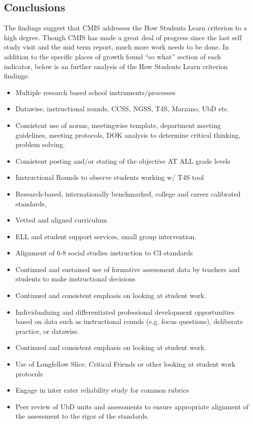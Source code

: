 \subsection{Conclusions}

\begin{findings}

The findings suggest that CMIS addresses the How Students Learn criterion to a high degree. Though CMIS has made a great deal of progress since the last self study visit and the mid term report, much more work needs to be done. In addition to the specific places of growth found “so what” section of each indicator, below is an further analysis of the How Students Learn criterion findings:

\begin{itemize}
\item Multiple research based school instruments/processes
\item Datawise, instructional rounds, CCSS, NGSS, T4S, Marzano, UbD etc. 
\item Consistent use of norms, meetingwise template, department meeting guidelines, meeting protocols, DOK analysis to determine critical thinking, problem solving.
\item Consistent posting and/or stating of the objective AT ALL grade levels
\item Instructional Rounds to observe students working w/ T4S tool
\item Research-based, internationally benchmarked, college and career calibrated standards, 
\item Vetted and aligned curriculum
\item ELL and student support services, small group intervention. 
\end{itemize}


\begin{itemize}
\item Alignment of 6-8 social studies instruction to C3 standards
\item Continued and sustained use of formative assessment data by teachers and students to make instructional decisions
\item Continued and consistent emphasis on looking at student work. 
\item Individualizing and differentiated professional development opportunities based on data such as instructional rounds (e.g. focus questions), deliberate practice, or datawise. 
\item Continued and consistent emphasis on looking at student work. 
\item Use of Longfellow Slice, Critical Friends or other looking at student work protocols 
\item Engage in inter rater reliability study for common rubrics
\item Peer review of UbD units and assessments  to ensure appropriate alignment of the assessment to the rigor of the standards. 
\end{itemize}
\end{findings}

